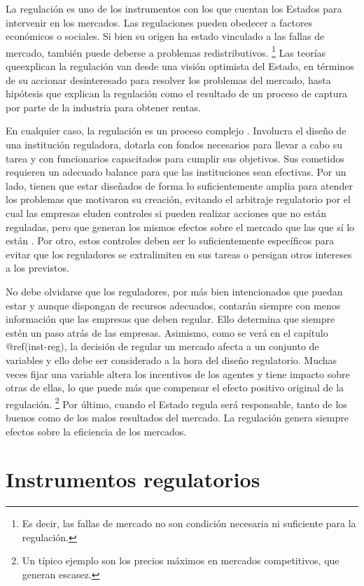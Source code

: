 \documentclass[
  12pt,
  spanish,
]{book}
\begin{document}
La regulación es uno de los instrumentos con los que cuentan los Estados
para intervenir en los mercados. Las regulaciones pueden obedecer a
factores económicos o sociales. Si bien su origen ha estado vinculado a
las fallas de mercado, también puede deberse a problemas
redistributivos. \footnote{Es decir, las fallas de mercado no son
  condición necesaria ni suficiente para la regulación.} Las teorías
queexplican la regulación van desde una visión optimista del Estado, en
términos de su accionar desinteresado para resolver los problemas del
mercado, hasta hipótesis que explican la regulación como el resultado de
un proceso de captura por parte de la industria para obtener rentas.

En cualquier caso, la regulación es un proceso complejo
\citep{Dixit1998}. Involucra el diseño de una institución reguladora,
dotarla con fondos necesarios para llevar a cabo su tarea y con
funcionarios capacitados para cumplir sus objetivos. Sus cometidos
requieren un adecuado balance para que las instituciones sean efectivas.
Por un lado, tienen que estar diseñados de forma lo suficientemente
amplia para atender los problemas que motivaron su creación, evitando el
arbitraje regulatorio por el cual las empresas eluden controles si
pueden realizar acciones que no están reguladas, pero que generan los
mismos efectos sobre el mercado que las que sí lo están . Por otro,
estos controles deben ser lo suficientemente específicos para evitar que
los reguladores se extralimiten en sus tareas o persigan otros intereses
a los previstos.

No debe olvidarse que los reguladores, por más bien intencionados que
puedan estar y aunque dispongan de recursos adecuados, contarán siempre
con menos información que las empresas que deben regular. Ello determina
que siempre estén un paso atrás de las empresas. Asimismo, como se verá
en el capítulo @ref(inst-reg), la decisión de regular un mercado afecta
a un conjunto de variables y ello debe ser considerado a la hora del
diseño regulatorio. Muchas veces fijar una variable altera los
incentivos de los agentes y tiene impacto sobre otras de ellas, lo que
puede más que compensar el efecto positivo original de la regulación.
\footnote{Un típico ejemplo son los precios máximos en mercados
  competitivos, que generan escasez.} Por último, cuando el Estado
regula será responsable, tanto de los buenos como de los malos
resultados del mercado. La regulación genera siempre efectos sobre la
eficiencia de los mercados.

\hypertarget{inst-reg}{%
\chapter{Instrumentos regulatorios}\label{inst-reg}}
\end{document}
